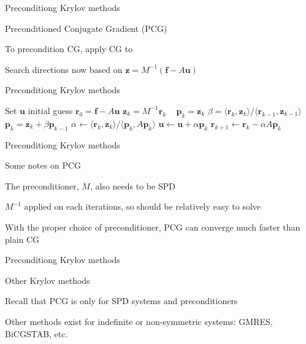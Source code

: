 \documentclass[18pt,xcolor=table]{beamer}
\begin{document}
\begin{frame}{Preconditiong Krylov methods}
\begin{block}{Preconditioned Conjugate Gradient (PCG)}
\bit
\item To precondition CG, apply CG to
\item Search directions now based on $\mathbf{z} = M^{-1}(\mathbf{f} - A\mathbf{u})$ 
\eit
\end{block}
\end{frame}

\begin{frame}{Preconditiong Krylov methods}
\begin{algorithm}[H]
\caption{Preconditioned Conjugate Gradient (PCG)}
\begin{algorithmic}
\State Set $\mathbf{u}$ initial guess
\State $\mathbf{r}_0 = \mathbf{f} - A\mathbf{u}$
\State $\mathbf{z}_k = M^{-1}\mathbf{r}_k$ \
\State $\mathbf{p}_k = \mathbf{z}_k$
\Else
\State $\beta  = \langle \mathbf{r}_k, \mathbf{z}_k \rangle / \langle \mathbf{r}_{k-1}, \mathbf{z}_{k-1} \rangle$
\State $\mathbf{p}_k = \mathbf{z}_k + \beta \mathbf{p}_{k-1}$
\EndIf
\State $\alpha \leftarrow \langle \mathbf{r}_k, \mathbf{z}_k \rangle / \langle \mathbf{p}_k, A\mathbf{p}_k \rangle$
\State $\mathbf{u} \leftarrow \mathbf{u} + \alpha\mathbf{p}_k$
\State $\mathbf{r}_{k+1} \leftarrow \mathbf{r}_k - \alpha A\mathbf{p}_k$
\EndFor
\end{algorithmic}
\end{algorithm}
\end{frame}

\begin{frame}{Preconditiong Krylov methods}
\begin{block}{Some notes on PCG}
\bit
\item The preconditioner, $M$, also needs to be SPD
\item $M^{-1}$ applied on each iterations, so should be relatively easy to solve
\item With the proper choice of preconditioner, PCG can converge much faster than plain CG
\eit
\end{block}
\end{frame}

\begin{frame}{Preconditiong Krylov methods}
\begin{block}{Other Krylov methods}
\bit
\item Recall that PCG is only for SPD systems and preconditioners
\item Other methods exist for indefinite or non-symmetric systems: GMRES, BiCGSTAB, etc.
\eit
\end{block}
\end{frame}

\end{document}
